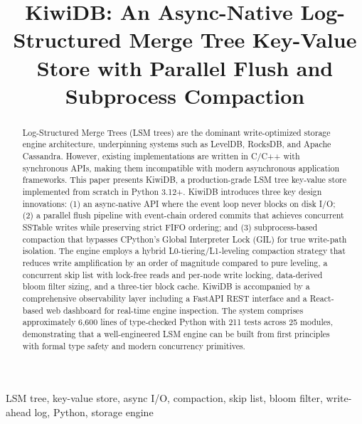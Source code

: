 \documentclass[conference]{IEEEtran}
\begin{document}
\title{KiwiDB: An Async-Native Log-Structured Merge Tree Key-Value Store with Parallel Flush and Subprocess Compaction}

\author{
}

\maketitle

\begin{abstract}
Log-Structured Merge Trees (LSM trees) are the dominant write-optimized storage engine architecture, underpinning systems such as LevelDB, RocksDB, and Apache Cassandra. However, existing implementations are written in C/C++ with synchronous APIs, making them incompatible with modern asynchronous application frameworks. This paper presents KiwiDB, a production-grade LSM tree key-value store implemented from scratch in Python 3.12+. KiwiDB introduces three key design innovations: (1) an async-native API where the event loop never blocks on disk I/O; (2) a parallel flush pipeline with event-chain ordered commits that achieves concurrent SSTable writes while preserving strict FIFO ordering; and (3) subprocess-based compaction that bypasses CPython's Global Interpreter Lock (GIL) for true write-path isolation. The engine employs a hybrid L0-tiering/L1-leveling compaction strategy that reduces write amplification by an order of magnitude compared to pure leveling, a concurrent skip list with lock-free reads and per-node write locking, data-derived bloom filter sizing, and a three-tier block cache. KiwiDB is accompanied by a comprehensive observability layer including a FastAPI REST interface and a React-based web dashboard for real-time engine inspection. The system comprises approximately 6,600 lines of type-checked Python with 211 tests across 25 modules, demonstrating that a well-engineered LSM engine can be built from first principles with formal type safety and modern concurrency primitives.
\end{abstract}

\begin{IEEEkeywords}
LSM tree, key-value store, async I/O, compaction, skip list, bloom filter, write-ahead log, Python, storage engine
\end{IEEEkeywords}
\end{document}
